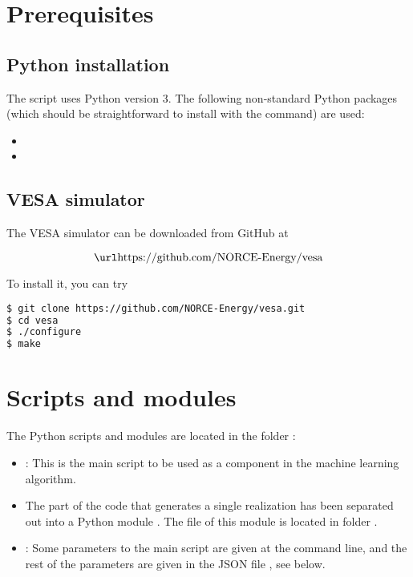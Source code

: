 \documentclass[11pt,a4paper]{amsart}
\begin{document}
\section{Prerequisites}
\subsection{Python installation}
The script uses Python version 3.
The following non-standard Python
packages (which should be straightforward to install with the \pythonPip{} 
\cite{pyt18:pip} command) are used:
\begin{itemize}
\item {}
\item {}
\end{itemize}
\subsection{VESA simulator}
The VESA simulator can be downloaded from GitHub at

\[ \text{\vesaGitHub{}} \]

To install it, you can try
\begin{lstlisting}[language=bash]
$ git clone https://github.com/NORCE-Energy/vesa.git
$ cd vesa
$ ./configure
$ make
\end{lstlisting}


\section{Scripts and modules}
The Python scripts and modules are located in the folder :
\begin{itemize}
\item \mainScriptKJ{} : This is the main script to be used as a component in the
  machine learning algorithm.
\item The part of the code that generates a single realization has been
  separated out into a Python module . The file of
  this module is located in folder .
\item \jsonInputParamFile{} : Some parameters to the main script
  \mainScriptKJ{} are given at the command line, and the rest of the
  parameters are given in the JSON file \jsonInputParamFile{}, see below.
\end{itemize}
\end{document}
